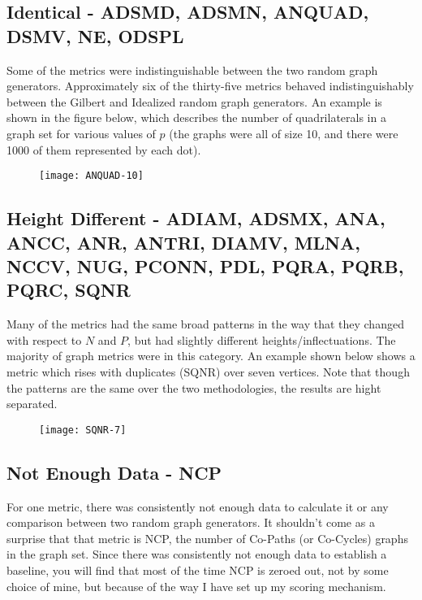 \subsection*{Identical - ADSMD, ADSMN, ANQUAD, DSMV, NE, ODSPL} 
Some of the metrics were indistinguishable between the two random graph generators.
Approximately six of the thirty-five metrics behaved indistinguishably between the Gilbert and Idealized random graph generators.
An example is shown in the figure below, which describes the number of quadrilaterals in a graph set for various values of $p$ (the graphs were all of size 10, and there were 1000 of them represented by each dot).

\begin{figure}[h]
\label{fig:anquad10}
\caption{}
\centering
\texttt{[image: ANQUAD-10]}
\end{figure}

\subsection*{Height Different - ADIAM, ADSMX, ANA, ANCC, ANR, ANTRI, DIAMV, MLNA, NCCV, NUG, PCONN, PDL, PQRA, PQRB, PQRC, SQNR} 
Many of the metrics had the same broad patterns in the way that they changed with respect to $N$ and $P$, but had slightly different heights/inflectuations.
The majority of graph metrics were in this category.
An example shown below shows a metric which rises with duplicates (SQNR) over seven vertices.
Note that though the patterns are the same over the two methodologies, the results are hight separated.

\begin{figure}[h]
\label{fig:sqnr7}
\caption{}
\centering
\texttt{[image: SQNR-7]}
\end{figure}

\subsection*{Not Enough Data - NCP}
For one metric, there was consistently not enough data to calculate it or any comparison between two random graph generators.
It shouldn't come as a surprise that that metric is NCP, the number of Co-Paths (or Co-Cycles) graphs in the graph set. 
Since there was consistently not enough data to establish a baseline, you will find that most of the time NCP is zeroed out, not by some choice of mine, but because of the way I have set up my scoring mechanism.

